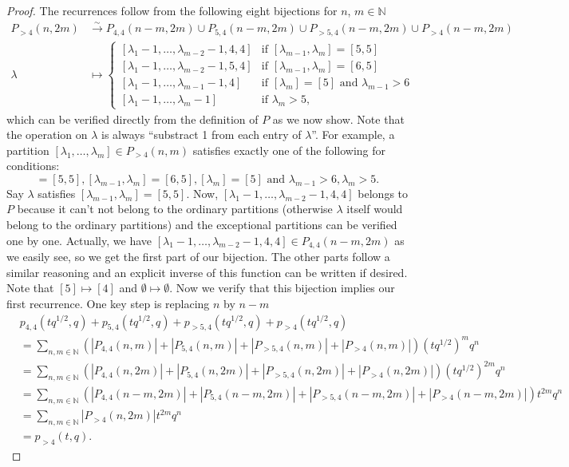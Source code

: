\documentclass[12pt, a4paper]{article}
\begin{document}
\begin{proof}
  The recurrences follow from the following eight bijections for $n$, $m \in \mathbb{N}$
  \begin{align*}
    P_{>4}(n, 2m) &\xrightarrow{\sim} P_{4, 4}(n - m, 2m) \cup P_{5, 4}(n - m, 2m) \cup P_{>5, 4}(n - m, 2m) \cup P_{>4}(n - m, 2m) \\
    \lambda &\mapsto
              \begin{cases}
                [\lambda_1 - 1, \dots, \lambda_{m - 2} - 1, 4, 4] &\text{if }[\lambda_{m - 1}, \lambda_m] = [5, 5] \\
                [\lambda_1 - 1, \dots, \lambda_{m - 2} - 1, 5, 4] &\text{if }[\lambda_{m - 1}, \lambda_m] = [6, 5] \\
                [\lambda_1 - 1, \dots, \lambda_{m - 1} - 1, 4] &\text{if }[\lambda_m] = [5]\text{ and }\lambda_{m - 1} > 6 \\
                [\lambda_1 - 1, \dots, \lambda_m - 1] &\text{if }\lambda_m > 5,
              \end{cases}
  \end{align*}
  which can be verified directly from the definition of $P$ as we now show.
  Note that the operation on $\lambda$ is always ``substract 1 from each entry of $\lambda$''.
  For example, a partition $[\lambda_1, \dots, \lambda_m] \in P_{>4}(n, m)$ satisfies exactly one of the following for conditions:
  \begin{equation*}
    [\lambda_{m - 1}, \lambda_m] = [5, 5], [\lambda_{m - 1}, \lambda_m] = [6, 5], [\lambda_m] = [5]\text{ and }\lambda_{m - 1} > 6, \lambda_m > 5.
  \end{equation*}
  Say $\lambda$ satisfies $[\lambda_{m - 1}, \lambda_m] = [5, 5]$.
  Now, $[\lambda_1 - 1, \dots, \lambda_{m - 2} - 1, 4, 4]$ belongs to $P$ because it can't not belong to the ordinary partitions (otherwise $\lambda$ itself would belong to the ordinary partitions) and the exceptional partitions can be verified one by one.
  Actually, we have $[\lambda_1 - 1, \dots, \lambda_{m - 2} - 1, 4, 4] \in P_{4, 4}(n - m, 2m)$ as we easily see, so we get the first part of our bijection.
  The other parts follow a similar reasoning and an explicit inverse of this function can be written if desired.
  Note that $[5] \mapsto [4]$ and $\emptyset \mapsto \emptyset$.
  Now we verify that this bijection implies our first recurrence.
  One key step is replacing $n$ by $n - m$
  \begin{align*}
    &p_{4, 4}(tq^{1/2}, q) + p_{5, 4}(tq^{1/2}, q) + p_{>5, 4}(tq^{1/2}, q) + p_{>4}(tq^{1/2}, q) \\
    &= \sum_{n, m\in \mathbb{N}}(|P_{4, 4}(n, m)| + |P_{5, 4}(n, m)| + |P_{>5, 4}(n, m)| + |P_{>4}(n, m)|)(tq^{1/2})^mq^n \\
    &= \sum_{n, m\in \mathbb{N}}(|P_{4, 4}(n, 2m)| + |P_{5, 4}(n, 2m)| + |P_{>5, 4}(n, 2m)| + |P_{>4}(n, 2m)|)(tq^{1/2})^{2m}q^n \\
    &= \sum_{n, m\in \mathbb{N}}(|P_{4, 4}(n - m, 2m)| + |P_{5, 4}(n - m, 2m)| + |P_{>5, 4}(n - m, 2m)| + |P_{>4}(n - m, 2m)|)t^{2m}q^n \\
    &= \sum_{n, m\in \mathbb{N}}|P_{>4}(n, 2m)|t^{2m}q^n \\
    &= p_{>4}(t, q).
  \end{align*}
  

\end{proof}
\end{document}
